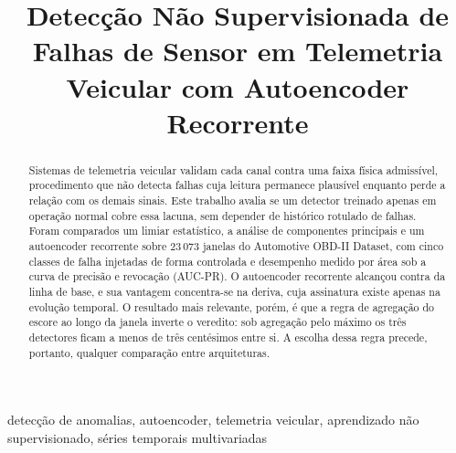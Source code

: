 \documentclass[conference]{IEEEtran}
\begin{document}
\title{Detecção Não Supervisionada de Falhas de Sensor em Telemetria Veicular com Autoencoder Recorrente}

\author{
\and
{}
}

\maketitle

\begin{abstract}
Sistemas de telemetria veicular validam cada canal contra uma faixa física admissível, procedimento que não detecta falhas cuja leitura permanece plausível enquanto perde a relação com os demais sinais.
Este trabalho avalia se um detector treinado apenas em operação normal cobre essa lacuna, sem depender de histórico rotulado de falhas.
Foram comparados um limiar estatístico, a análise de componentes principais e um autoencoder recorrente sobre 23\,073 janelas do Automotive OBD-II Dataset, com cinco classes de falha injetadas de forma controlada e desempenho medido por área sob a curva de precisão e revocação (AUC-PR).
O autoencoder recorrente alcançou \ResultAutoencoderAucPrMean{} contra \ResultLimiarAucPrMean{} da linha de base, e sua vantagem concentra-se na deriva, cuja assinatura existe apenas na evolução temporal.
O resultado mais relevante, porém, é que a regra de agregação do escore ao longo da janela inverte o veredito: sob agregação pelo máximo os três detectores ficam a menos de três centésimos entre si.
A escolha dessa regra precede, portanto, qualquer comparação entre arquiteturas.
\end{abstract}

\begin{IEEEkeywords}
detecção de anomalias, autoencoder, telemetria veicular, aprendizado não supervisionado, séries temporais multivariadas
\end{IEEEkeywords}
\end{document}
